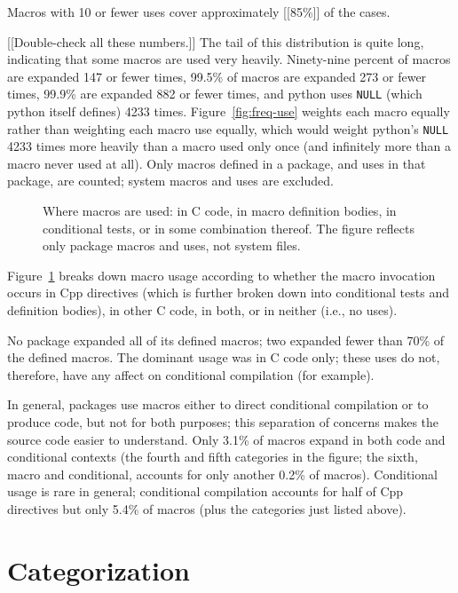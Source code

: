 \documentclass[11pt]{article}
\newcommand{\pkg}[1]{\textsf{#1}}
\begin{document}
Macros with 10 or fewer uses
cover approximately [[85\%]] of the cases.

[[Double-check all these numbers.]]
The tail of this distribution is quite long, indicating that some macros
are used very heavily.  Ninety-nine percent of macros are expanded 147 or fewer
times, 99.5\% of macros are expanded 273 or fewer times, 99.9\% are
expanded 882 or fewer times, and \pkg{python} uses {\tt NULL} (which \pkg{python}
itself defines) 4233 times.  Figure~\ref{fig:freq-use} weights each macro
equally rather than weighting each macro use equally, which would weight
\pkg{python}'s {\tt NULL} 4233 times more heavily than a macro used only once
(and infinitely more than a macro never used at all).  Only macros defined
in a package, and uses in that package, are counted; system macros and uses
are excluded.


\begin{figure}
\centerline{}
\caption{Where macros are used: in C code, in macro definition bodies, in
  conditional tests, or in some combination thereof.  The figure reflects
  only package macros and uses, not system files.}
\label{fig:where-used}
\end{figure}

Figure~\ref{fig:where-used} breaks down macro usage according to whether
the macro invocation occurs in Cpp directives (which is further broken
down into conditional tests and definition bodies), in other C code, in
both, or in neither (i.e., no uses).

No package expanded all of its defined macros; two expanded fewer than 70\%
of the defined macros.  The dominant usage was in C code only; these uses
do not, therefore, have any affect on conditional compilation (for example).

In general, packages use macros either to direct conditional compilation or
to produce code, but not for both purposes; this separation of concerns
makes the source code easier to understand.  Only 3.1\% of macros expand in
both code and conditional contexts (the fourth and fifth categories in the
figure; the sixth, macro and conditional, accounts for only another 0.2\%
of macros). 
Conditional usage is rare in general; conditional compilation accounts for
half of Cpp directives but only 5.4\% of macros (plus the categories just
listed above).



\section{Categorization}
\label{sec:categorization}
\end{document}
